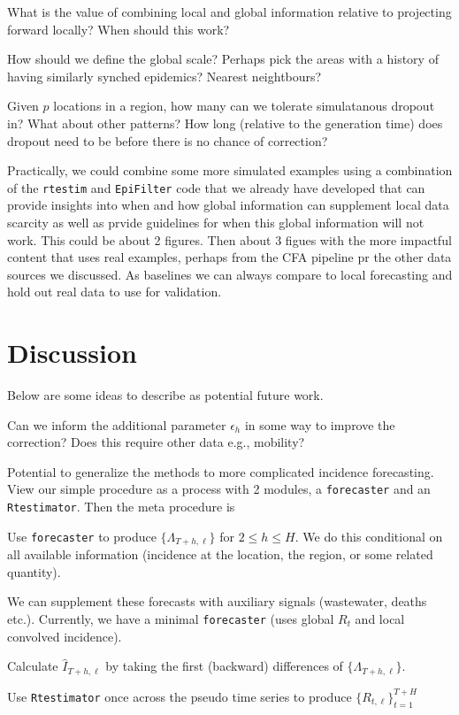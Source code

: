 \documentclass[12pt]{article}
\begin{document}
\bitem
\item What is the value of combining local and global information relative to
projecting forward locally? When should this work?
\item How should we define the global scale? Perhaps pick the areas with a
history of having similarly synched epidemics? Nearest neightbours?
\item Given $p$ locations in a region, how many can we tolerate simulatanous
dropout in? What about other patterns? How long (relative to the generation
time) does dropout need to be before there is no chance of correction?
\eitem

Practically, we could combine some more simulated examples using a combination
of the \texttt{rtestim} and \texttt{EpiFilter} code that we already have
developed that can provide insights into when and how global information can
supplement local data scarcity as well as prvide guidelines for when this global
information will not work. This could be about 2 figures. Then about 3 figues
with the more impactful content that uses real examples, perhaps from the CFA
pipeline pr the other data sources we discussed. As baselines we can always
compare to local forecasting and hold out real data to use for validation. 


\section*{Discussion}

Below are some ideas to describe as potential future work.

\bitem
\item Can we inform the additional parameter $\epsilon_h$ in some way to improve
the correction? Does this require other data e.g., mobility?

\item Potential to generalize the methods to more complicated incidence forecasting.
View our simple procedure as a process with 2 modules, a
\texttt{forecaster} and an \texttt{Rtestimator}. Then the meta procedure is

\benum
\item Use \texttt{forecaster} to produce $\{\Lambda_{T+h, \ell}\}$ for $2\leq h
\leq H$. We do this conditional on all available information (incidence at the
location, the region, or some related quantity). 
\item We can supplement these forecasts with auxiliary signals (wastewater,
deaths etc.). Currently, we have a minimal \texttt{forecaster} (uses global $R_t$
and local convolved incidence).
\item Calculate $\hat{I}_{T+h, \ell}$ by taking the first (backward) differences
of $\{\Lambda_{T+h, \ell}\}$.
\item Use \texttt{Rtestimator} once across the pseudo time series to produce
$\{R_{t, \ell}\}_{t=1}^{T+H}$
\eenum
\end{document}
